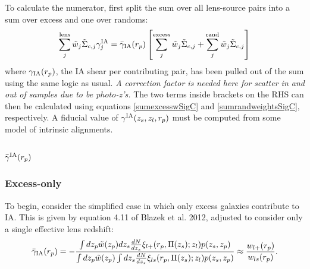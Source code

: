 \documentclass[onecolumn,amsmath,aps,fleqn, superscriptaddress]{revtex4}
\begin{document}
To calculate the numerator, first split the sum over all lens-source pairs into a sum over excess and one over randoms:
\begin{equation}
\sum\limits_{j}^{\rm lens} \tilde{w}_j \tilde{\Sigma}_{c,j} \gamma^{\rm IA}_j  = \bar{\gamma}_{\rm IA}(r_p)\left[\sum\limits_{j}^{\rm excess} \tilde{w}_j \tilde{\Sigma}_{c,j}  + \sum\limits_{j}^{\rm rand} \tilde{w}_j \tilde{\Sigma}_{c,j} \right]
\label{splitIA}
\end{equation}
where $\gamma_{\rm IA}(r_p)$, the IA shear per contributing pair, has been pulled out of the sum using the same logic as usual. {\it A correction factor is needed here for scatter in and out of samples due to be photo-z's.} The two terms inside brackets on the RHS can then be calculated using equations \ref{sumexcesswSigC} and \ref{sumrandweightsSigC}, respectively. A fiducial value of $\gamma^{\rm IA}(z_s, z_l, r_p)$ must be computed from some model of intrinsic alignments. 

\subsection*{$\bar{\gamma}^{\rm IA}(r_p)$}
\subsubsection*{Excess-only}
To begin, consider the simplified case in which only excess galaxies contribute to IA. This is given by equation 4.11 of Blazek et al. 2012, adjusted to consider only a single effective lens redshift:
\begin{equation}
\bar{\gamma}_{\rm IA}(r_p) = -\frac{\int dz_p \tilde{w}(z_p) dz_s \frac{dN}{dz_s} \xi_{l+}(r_p, \Pi(z_s); z_l) p(z_s, z_p)}{\int dz_p \tilde{w}(z_p) \int dz_s \frac{dN}{dz_s} \xi_{ls}(r_p, \Pi(z_s); z_l) p(z_s, z_p)} \approx \frac{w_{l+}(r_p)}{w_{ls}(r_p)}.
\label{gamma_blazek}
\end{equation} 
\end{document}
